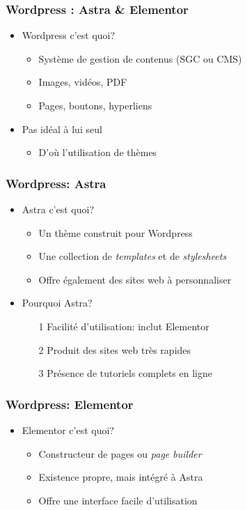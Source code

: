 \documentclass{beamer}
\begin{document}
    \begin{frame}
      \frametitle{Wordpress : Astra \& Elementor}
      \begin{itemize}
        \item<2-> Wordpress c'est quoi? 
          \begin{itemize}
            \item Système de gestion de contenus (SGC ou CMS)
            \item Images, vidéos, PDF
            \item Pages, boutons, hyperliens
          \end{itemize}
        \item<3-> Pas idéal à lui seul
          \begin{itemize}
            \item D'où l'utilisation de thèmes
          \end{itemize}
      \end{itemize}
    \end{frame}
    
    \begin{frame}
      \frametitle{Wordpress: Astra}
      \begin{itemize}
        \item<2-> Astra c'est quoi? 
          \begin{itemize}
            \item Un thème construit pour Wordpress
            \item Une collection de \textit{templates} et de \textit{stylesheets}
            \item Offre également des sites web à personnaliser 
          \end{itemize}
        \item<3-> Pourquoi Astra?
          \begin{enumerate}
            \item[1] Facilité d'utilisation: inclut Elementor
            \item[2] Produit des sites web très rapides
            \item[3] Présence de tutoriels complets en ligne
          \end{enumerate}
        \end{itemize}
      \end{frame}
      
      \begin{frame}
        \frametitle{Wordpress: Elementor}
        \begin{itemize}
          \item<2-> Elementor c'est quoi? 
            \begin{itemize}
              \item Constructeur de pages ou \textit{page builder}
              \item Existence propre, mais intégré à Astra
              \item Offre une interface facile d'utilisation
            \end{itemize}
        \end{itemize}
      \end{frame}
        
\end{document}
